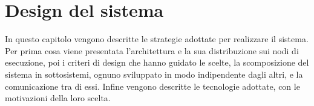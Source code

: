 





\chapter{Design del sistema}
\label{ChapterDesignSistema}

In questo capitolo vengono descritte le strategie adottate per realizzare il sistema. Per prima cosa viene presentata l'architettura e la sua distribuzione sui nodi di esecuzione, poi i criteri di design che hanno guidato le scelte, la scomposizione del sistema in sottosistemi, ognuno sviluppato in modo indipendente dagli altri, e la comunicazione tra di essi. Infine vengono descritte le tecnologie adottate, con le motivazioni della loro scelta.

